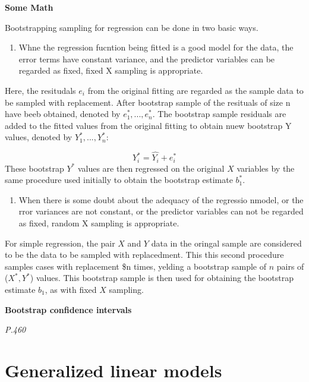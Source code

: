 \documentclass[]{book}
\providecommand{\tightlist}{%
  \setlength{\itemsep}{0pt}\setlength{\parskip}{0pt}}
\begin{document}
\textbf{Some Math}

Bootstrapping sampling for regression can be done in two basic ways.

\begin{enumerate}
\def\labelenumi{(\arabic{enumi})}
\tightlist
\item
  Whne the regression fucntion being fitted is a good model for the data, the error terms have constant variance, and the predictor variables can be regarded as fixed, fixed X sampling is appropriate.
\end{enumerate}

Here, the resitudals \(e_i\) from the original fitting are regarded as the sample data to be sampled with replacement. After bootstrap sample of the resituals of size n have beeb obtained, denoted by \(e_1^*, ..., e_n^*\). The bootstrap sample residuals are added to the fitted values from the original fitting to obtain nuew bootstrap Y values, denoted by \(Y_1^*,...,Y_n^*\):

\[Y_i^*=\hat{Y_i}+e_i^*\]
These bootstrap \(Y^*\) values are then regressed on the original \(X\) variables by the same procedure used initially to obtain the bootstrap estimate \(b_1^*\).

\begin{enumerate}
\def\labelenumi{(\arabic{enumi})}
\setcounter{enumi}{1}
\tightlist
\item
  When there is some doubt about the adequacy of the regressio nmodel, or the rror variances are not constant, or the predictor variables can not be regarded as fixed, random X sampling is appropriate.
\end{enumerate}

For simple regression, the pair \(X\) and \(Y\) data in the oringal sample are considered to be the data to be sampled with replacedment. This this second procedure samples cases with replacement \$n
times, yelding a bootstrap sample of \(n\) pairs of (\(X^*,Y^*\)) values. This bootstrap sample is then used for obtaining the bootstrap estimate \(b_1\), as with fixed \(X\) sampling.

\textbf{Bootstrap confidence intervals}

\emph{P.460}

\hypertarget{generalized-linear-models}{%
\section{Generalized linear models}\label{generalized-linear-models}}
\end{document}
